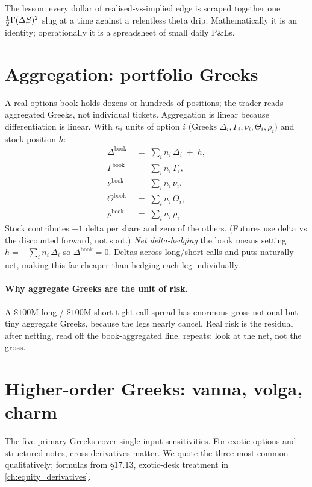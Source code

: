 The lesson: every dollar of realised-vs-implied edge is scraped
together one $\tfrac12 \Gamma (\Delta S)^2$ slug at a time
against a relentless theta drip. Mathematically it is an identity;
operationally it is a spreadsheet of small daily P\&Ls.

\section{Aggregation: portfolio Greeks}
\label{sec:ch16_aggregation}

A real options book holds dozens or hundreds of positions; the
trader reads aggregated Greeks, not individual tickets.
Aggregation is linear because differentiation is linear. With
$n_i$ units of option $i$ (Greeks $\Delta_i, \Gamma_i, \nu_i,
\Theta_i, \rho_i$) and stock position $h$:
\begin{align*}
  \Delta^{\text{book}} \;&=\; \sum_i n_i\,\Delta_i \;+\; h, \\
  \Gamma^{\text{book}} \;&=\; \sum_i n_i\,\Gamma_i, \\
  \nu^{\text{book}} \;&=\; \sum_i n_i\,\nu_i, \\
  \Theta^{\text{book}} \;&=\; \sum_i n_i\,\Theta_i, \\
  \rho^{\text{book}} \;&=\; \sum_i n_i\,\rho_i.
\end{align*}
Stock contributes $+1$ delta per share and zero of the others.
(Futures use delta vs the discounted forward, not spot.)
\emph{Net delta-hedging} the book means setting
$h = -\sum_i n_i\,\Delta_i$ so $\Delta^{\text{book}} = 0$. Deltas
across long/short calls and puts naturally net, making this far
cheaper than hedging each leg individually.

\paragraph{Why aggregate Greeks are the unit of risk.}
A $\$100$M-long / $\$100$M-short tight call spread has enormous
gross notional but tiny aggregate Greeks, because the legs nearly
cancel. Real risk is the residual after netting, read off the
book-aggregated line. \citeNatenberg repeats: look at the net, not
the gross.

\section{Higher-order Greeks: vanna, volga, charm}
\label{sec:ch16_higher_order}

The five primary Greeks cover single-input sensitivities. For
exotic options and structured notes, cross-derivatives matter. We
quote the three most common qualitatively; formulas from \citeHull
\S17.13, exotic-desk treatment in \cref{ch:equity_derivatives}.

